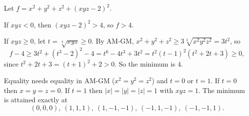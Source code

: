 Let $f=x^2+y^2+z^2+(xyz-2)^2$.

If $xyz<0$, then $(xyz-2)^2>4$, so $f>4$.

If $xyz\ge0$, let $t=\sqrt[3]{xyz}\ge0$. By AM-GM, $x^2+y^2+z^2\ge3\sqrt[3]{x^2y^2z^2}=3t^2$, so
\[f-4\ge3t^2+(t^3-2)^2-4=t^6-4t^3+3t^2=t^2(t-1)^2(t^2+2t+3)\ge0,\]
since $t^2+2t+3=(t+1)^2+2>0$. So the minimum is $\boxed{4}$.

Equality needs equality in AM-GM ($x^2=y^2=z^2$) and $t=0$ or $t=1$. If $t=0$ then $x=y=z=0$. If $t=1$ then $|x|=|y|=|z|=1$ with $xyz=1$. The minimum is attained exactly at
\[(0,0,0),\ (1,1,1),\ (1,-1,-1),\ (-1,1,-1),\ (-1,-1,1).\]
